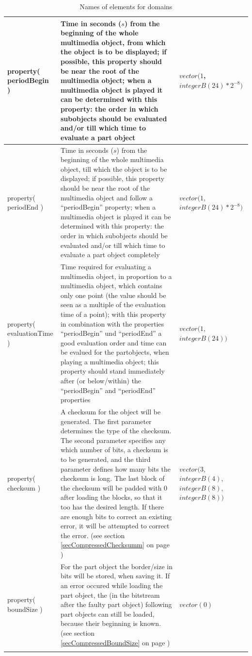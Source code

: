 \begin{center}
\begin{longtable}{|p{20mm}|p{55mm}|p{50mm}|}
	property( periodBegin ) & Time in seconds ($s$) from the beginning of the whole multimedia object, from which the object is to be displayed; if possible, this property should be near the root of the multimedia object; when a multimedia object is played it can be determined with this property: the order in which subobjects should be evaluated and/or till which time to evaluate a part object & $vector( 1$, $integerB(24) * 2^{-8} )$ \\\hline
	property( periodEnd ) & Time in seconds ($s$) from the beginning of the whole multimedia object, till which the object is to be displayed; if possible, this property should be near the root of the multimedia object and follow a ``periodBegin'' property; when a multimedia object is played it can be determined with this property: the order in which subobjects should be evaluated and/or till which time to evaluate a part object completely & $vector( 1$, $integerB(24) * 2^{-8} )$ \\\hline
	property( evaluationTime ) & Time required for evaluating a multimedia object, in proportion to a multimedia object, which contains only one point (the value should be seen as a multiple of the evaluation time of a point); with this property in combination with the properties ``periodBegin'' und ``periodEnd'' a good evaluation order and time can be evalued for the partobjects, when playing a multimedia object; this property should stand immediately after (or below/within) the ``periodBegin'' and ``periodEnd'' properties & $vector( 1$, $integerB(24) )$ \\\hline

	property( checksum ) &  A checksum for the object will be generated. The first parameter determines the type of the checksum. The second parameter specifies any which number of bits, a checksum is to be generated, and the third parameter defines how many bits the checksum is long. The last block of the checksum will be padded with 0 after loading the blocks, so that it too has the desired length. If there are enough bits to correct an existing error, it will be attempted to correct the error. (see section \ref{secCompressedChecksumm} on page \pageref{secCompressedChecksumm}) & $vector( 3$, $integerB(4)$,  $integerB(8)$, $integerB(8) )$\\\hline
	property( boundSize ) & For the part object the border/size in bits will be stored, when saving it. If an error occured while loading the part object, the (in the bitstream after the faulty part object) following part objects can still be loaded, because their beginning is known. (see section \ref{secCompressedBoundSize} on page \pageref{secCompressedBoundSize}) & $vector( 0 )$ \\\hline



\caption{Names of elements for domains}
\label{tableElementsForDomains}
\end{longtable}
\end{center}


